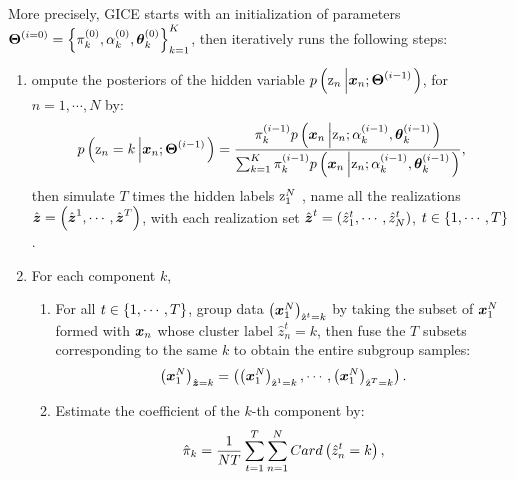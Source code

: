 More precisely, GICE starts with an initialization of parameters $\boldsymbol{\Theta}^{(i=0)}=\left\{\pi_k^{(0)}, \alpha_k^{(0)}, \boldsymbol{\theta}_k^{(0)}\right\}_{k=1}^K$, then iteratively runs the following steps: 
\begin{enumerate}
    \item {}ompute the posteriors of the hidden variable $p\left( \mathrm{z}_{n} \left| \boldsymbol{x}_{n}; \boldsymbol{\Theta}^{(i-1)} \right.\right)$, for $n=1,\cdots,N$ by:
    \begin{equation}
        \label{eq:GICE posterior of z}
        p\left( \mathrm{z}_{n}=k \left| \boldsymbol{x}_{n}; \boldsymbol{\Theta}^{(i-1)} \right.\right) = \frac{\pi_k^{(i-1)} p\left( \boldsymbol{x}_{n} \left| \mathrm{z}_{n}; \alpha_k^{(i-1)}, \boldsymbol{\theta}_k^{(i-1)} \right.\right) }{\sum_{k=1}^K \pi_k^{(i-1)} p\left( \boldsymbol{x}_{n} \left| \mathrm{z}_{n}; \alpha_k^{(i-1)}, \boldsymbol{\theta}_k^{(i-1)} \right.\right)},
    \end{equation}
    then simulate $T$ times the hidden labels $\mathrm{z}_{1}^N$ , name all the realizations $\hat{\mathrm{\boldsymbol{z}}} = \left(\hat{\mathrm{\boldsymbol{z}}}^1,\cdots,\hat{\mathrm{\boldsymbol{z}}}^T\right)$, with each realization set $\hat{\mathrm{\boldsymbol{z}}}^t = \left(\hat{z}_1^t,\cdots,\hat{z}_N^t\right)$, $t\in\left\{1,\cdots,T\right\}$.
    \item For each component $k$, 
    \begin{enumerate}
        \item For all $t\in\left\{1,\cdots,T\right\}$, group data $\left(\boldsymbol{x}_1^N\right)_{\hat{\mathrm{z}}^t=k}$ by taking the subset of $\boldsymbol{x}_1^N$ formed with $\boldsymbol{x}_n$ whose cluster label $\hat{z}_n^t=k$, then fuse the $T$     
        subsets corresponding to the same $k$ to obtain the entire subgroup samples:
        \begin{equation}
            \label{eq:GICE subgroup samples}
             \left(\boldsymbol{x}_1^N\right)_{\hat{\mathrm{\boldsymbol{z}}}=k} = \left(\left(\boldsymbol{x}_1^N\right)_{\hat{\mathrm{z}}^1=k},\cdots,\left(\boldsymbol{x}_1^N\right)_{\hat{\mathrm{z}}^T=k}\right).
        \end{equation}
        \item Estimate the coefficient of the $k$-th component by:
            \begin{equation}
            \label{eq:GICE update pi_k}
                \hat{\pi}_k = \blueCN{\frac{1}{NT}}\sum_{t=1}^T\sum_{n=1}^N\Card{\hat{z}_n^t=k},

\end{equation}
\end{enumerate}
\end{enumerate}
